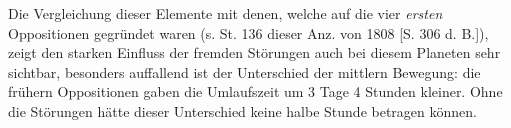 \par\indent Die Vergleichung dieser Elemente mit denen, welche auf die vier \emph{ersten} Oppositionen gegründet waren (s. St. 136 dieser Anz. von 1808 [S. 306 d. B.]), zeigt den starken Einfluss der fremden Störungen auch bei diesem Planeten sehr sichtbar, besonders auffallend ist der Unterschied der mittlern Bewegung: die frühern Oppositionen gaben die Umlaufszeit um 3 Tage 4 Stunden kleiner. Ohne die Störungen hätte dieser Unterschied keine halbe Stunde betragen können.
